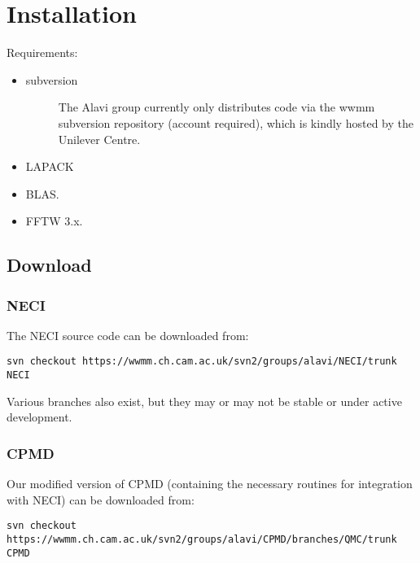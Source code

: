 \documentclass[openany,a4paper,10pt,english]{manual}
\begin{document}
\hypertarget{installation}{}\chapter{Installation}

Requirements:
\begin{itemize}
\item {} \begin{description}
\item[subversion] \leavevmode
The Alavi group currently only distributes code via the wwmm
subversion repository (account required), which is kindly hosted
by the Unilever Centre.

\end{description}

\item {} 
LAPACK

\item {} 
BLAS.

\item {} 
FFTW 3.x.

\end{itemize}


\section{Download}


\subsection{NECI}

The NECI source code can be downloaded from:

\begin{Verbatim}[commandchars=@\[\]]
svn checkout https://wwmm.ch.cam.ac.uk/svn2/groups/alavi/NECI/trunk NECI
\end{Verbatim}

Various branches also exist, but they may or may not be stable or under
active development.


\subsection{CPMD}

Our modified version of CPMD (containing the necessary routines for
integration with NECI) can be downloaded from:

\begin{Verbatim}[commandchars=@\[\]]
svn checkout https://wwmm.ch.cam.ac.uk/svn2/groups/alavi/CPMD/branches/QMC/trunk CPMD
\end{Verbatim}
\end{document}
